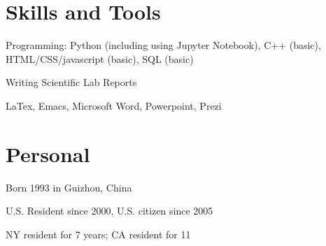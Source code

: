 \documentclass[letterpaper]{article}
\renewenvironment{itemize}{
  \begin{list}{}{
      \setlength{\leftmargin}{1.5em}
    }
}{
  \end{list}
}
\begin{document}
\section*{Skills and Tools}
\begin{itemize}
\item Programming: Python (including using Jupyter Notebook), C++ (basic), HTML/CSS/javascript (basic), SQL (basic)
\item Writing Scientific Lab Reports
\item LaTex, Emacs, Microsoft Word, Powerpoint, Prezi
\end{itemize}

\section*{Personal}

\begin{itemize}
\item Born 1993 in Guizhou, China
\item U.S. Resident since 2000, U.S. citizen since 2005
\item NY resident for 7 years; CA resident for 11
\end{itemize}
\end{document}
